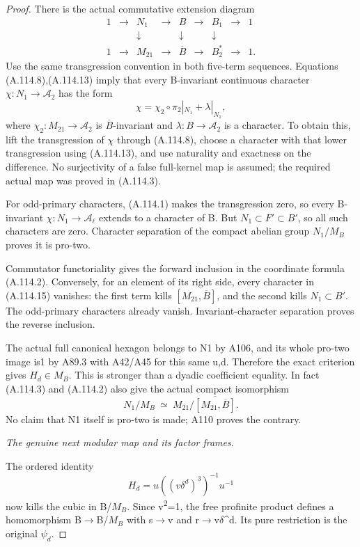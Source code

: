 \begin{proof}
There is the actual commutative extension diagram
\[
\begin{array}{ccccccccc}
1&\to&N_1&\to&B&\to&B_1&\to&1\\
 &&\downarrow&&\downarrow&&\downarrow\\
1&\to&M_{21}&\to&\overline B&\to&B_2^*&\to&1 .
\end{array}                                                  \tag{A.114.14}
\]
Use the same transgression convention in both five-term sequences. Equations (A.114.8),(A.114.13) imply that every B-invariant continuous character \(\chi:N_1\to\mathcal A_2\) has the form
\[
\chi=\chi_2\circ\pi_2|_{N_1}+\lambda|_{N_1},                  \tag{A.114.15}
\]
where \(\chi_2:M_{21}\to\mathcal A_2\) is \(\overline B\)-invariant and \(\lambda:B\to\mathcal A_2\) is a character. To obtain this, lift the transgression of \(\chi\) through (A.114.8), choose a character with that lower transgression using (A.114.13), and use naturality and exactness on the difference. No surjectivity of a false full-kernel map is assumed; the required actual map was proved in (A.114.3).

For odd-primary characters, (A.114.1) makes the transgression zero, so every B-invariant \(\chi:N_1\to\mathcal A_\ell\) extends to a character of B. But \(N_1\subset F'\subset B'\), so all such characters are zero. Character separation of the compact abelian group \(N_1/M_B\) proves it is pro-two.

Commutator functoriality gives the forward inclusion in the coordinate formula (A.114.2). Conversely, for an element of its right side, every character in (A.114.15) vanishes: the first term kills \([M_{21},\overline B]\), and the second kills \(N_1\subset B'\). The odd-primary characters already vanish. Invariant-character separation proves the reverse inclusion.

The actual full canonical hexagon belongs to N1 by A106, and its whole pro-two image is1 by A89.3 with A42/A45 for this same u,d. Therefore the exact criterion gives \(H_d\in M_B\). This is stronger than a dyadic coefficient equality. In fact (A.114.3) and (A.114.2) also give the actual compact isomorphism
\[
N_1/M_B\ \simeq\ 
M_{21}/\overline{[M_{21},\overline B]}.
\]
No claim that N1 itself is pro-two is made; A110 proves the contrary.

\medskip\noindent\emph{The genuine next modular map and its factor frames}.

The ordered identity
\[
H_d=u((v\delta^d)^3)^{-1}u^{-1}
\]
now kills the cubic in B/\(M_B\). Since v\textsuperscript{2}=1, the free profinite product defines a homomorphism B\(\to\)B/\(M_B\) with s\(\to\)v and r\(\to\)v\(\delta\)^d. Its pure restriction is the original \(\psi_d\).


\end{proof}
